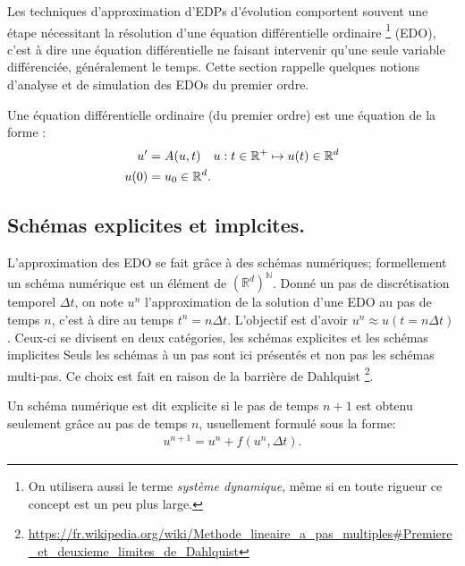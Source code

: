 Les techniques d'approximation d'EDPs d'évolution comportent souvent une étape nécessitant la résolution d'une équation différentielle ordinaire
\footnote{On utilisera aussi le terme \textit{système dynamique}, même si en toute rigueur ce concept est un peu plus large.} (EDO),
c'est à dire une équation différentielle ne faisant intervenir qu'une seule variable différenciée, généralement le temps. Cette section rappelle 
quelques notions d'analyse et de simulation des EDOs du premier ordre.\par

\begin{definition}
    Une équation différentielle ordinaire (du premier ordre) est une équation de la forme :
    \begin{align}\label{def:def_ODE}
        u' &= A(u,t)\quad u : t \in \mathbb{R}^+ \mapsto u(t) \in \mathbb{R}^d\\\notag
        u(0)&=u_0 \in \mathbb{R}^d.
    \end{align}
\end{definition}
\subsection{Schémas explicites et implcites.}
L'approximation des EDO se fait grâce à des schémas numériques; formellement un schéma numérique est un élément de $(\mathbb{R}^d)^\mathbb{N}$.
Donné un pas de discrétisation temporel $\Delta t$, on note $u^n$ l'approximation de la solution d'une EDO au pas de temps $n$, c'est à dire au temps $t^n = n \Delta t$.
L'objectif est d'avoir $u^n \approx u(t=n\Delta t)$.
Ceux-ci se divisent en deux catégories, les schémas explicites et les schémas implicites
Seuls les schémas à un pas sont ici présentés et non pas les schémas multi-pas. Ce choix est fait en raison de la barrière de Dahlquist
\footnote{\url{https://fr.wikipedia.org/wiki/Methode_lineaire_a_pas_multiples\#Premiere_et_deuxieme_limites_de_Dahlquist}}.


\begin{definition}
    Un schéma numérique est dit explicite si le pas de temps $n+1$ est obtenu seulement grâce au pas de temps $n$, usuellement formulé sous la forme:
    \begin{align}
        u^{n+1} = u^n + f(u^n ,\Delta t ).
    \end{align}
\end{definition}

